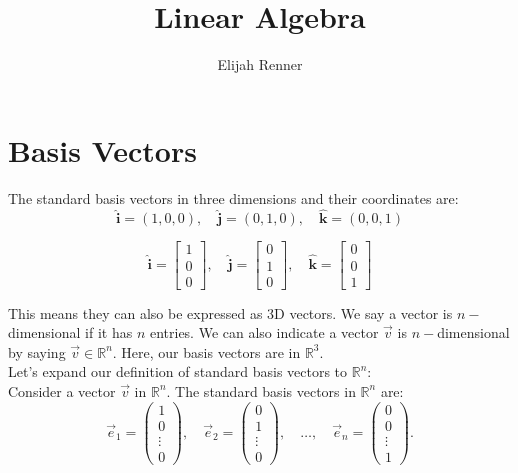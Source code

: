 \documentclass[12pt]{article}
\title{Linear Algebra}
\author{Elijah Renner}
\begin{document}
\maketitle

\vspace{0.5in}

\tableofcontents

\section{Basis Vectors}

The standard basis vectors in three dimensions and their coordinates are:\\
\[
\hat{\mathbf{i}} = (1, 0, 0), \quad \hat{\mathbf{j}} = (0, 1, 0), \quad \hat{\mathbf{k}} = (0, 0, 1)
\]

\[
\hat{\mathbf{i}} = 
\begin{bmatrix}
1\\
0\\
0	
\end{bmatrix}
, \quad \hat{\mathbf{j}} = \begin{bmatrix}
 0\\
 1\\
 0	
 \end{bmatrix}
, \quad \hat{\mathbf{k}} = 
\begin{bmatrix}
0\\
0\\
1	
\end{bmatrix}\]

This means they can also be expressed as 3D vectors. We say a vector is \(n-\)dimensional if it has \(n\) entries. We can also indicate a vector \(\vec{v}\) is \(n-\)dimensional by saying \(\vec{v}\in\mathbb{R}^n\). Here, our basis vectors are in \(\mathbb{R}^3\).\\

Let's expand our definition of standard basis vectors to \(\mathbb{R}^n\):\\

Consider a vector \(\vec{v}\) in \(\mathbb{R}^n\). The standard basis vectors in \(\mathbb{R}^n\) are:
\[
\vec{e}_1 = \begin{pmatrix} 1 \\ 0 \\ \vdots \\ 0 \end{pmatrix}, \quad
\vec{e}_2 = \begin{pmatrix} 0 \\ 1 \\ \vdots \\ 0 \end{pmatrix}, \quad \ldots, \quad
\vec{e}_n = \begin{pmatrix} 0 \\ 0 \\ \vdots \\ 1 \end{pmatrix}.
\]
\end{document}
